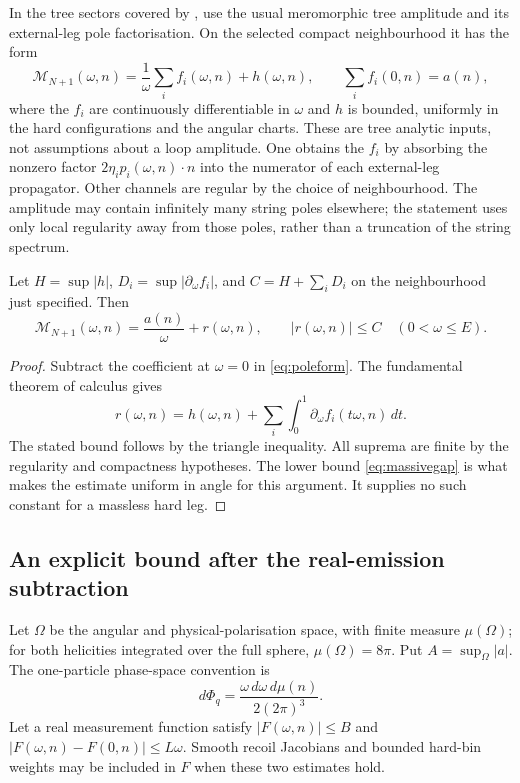 In the tree sectors covered by \cite{Sen17tree}, use the usual meromorphic tree amplitude and its external-leg pole factorisation. On the selected compact neighbourhood it has the form
\begin{equation}\label{eq:poleform}
 \mathcal M_{N+1}(\omega,n)=\frac{1}{\omega}\sum_i f_i(\omega,n)+h(\omega,n),
 \qquad \sum_i f_i(0,n)=a(n),
\end{equation}
where the $f_i$ are continuously differentiable in $\omega$ and $h$ is bounded, uniformly in the hard configurations and the angular charts. These are tree analytic inputs, not assumptions about a loop amplitude. One obtains the $f_i$ by absorbing the nonzero factor $2\eta_i p_i(\omega,n)\cdot n$ into the numerator of each external-leg propagator. Other channels are regular by the choice of neighbourhood. The amplitude may contain infinitely many string poles elsewhere; the statement uses only local regularity away from those poles, rather than a truncation of the string spectrum.

\begin{proposition}\label{prop:treeremainder}
Let $H=\sup|h|$, $D_i=\sup|\partial_\omega f_i|$, and $C=H+\sum_iD_i$ on the neighbourhood just specified. Then
\begin{equation}\label{eq:treeR}
 \mathcal M_{N+1}(\omega,n)=\frac{a(n)}{\omega}+r(\omega,n),
 \qquad |r(\omega,n)|\le C\quad(0<\omega\le E).
\end{equation}
\end{proposition}
\begin{proof}
Subtract the coefficient at $\omega=0$ in \eqref{eq:poleform}. The fundamental theorem of calculus gives
\[
 r(\omega,n)=h(\omega,n)
       +\sum_i\int_0^1\partial_\omega f_i(t\omega,n)\,dt.
\]
The stated bound follows by the triangle inequality. All suprema are finite by the regularity and compactness hypotheses. The lower bound \eqref{eq:massivegap} is what makes the estimate uniform in angle for this argument. It supplies no such constant for a massless hard leg.
\end{proof}

\subsection{An explicit bound after the real-emission subtraction}

Let $\Omega$ be the angular and physical-polarisation space, with finite measure $\mu(\Omega)$; for both helicities integrated over the full sphere, $\mu(\Omega)=8\pi$. Put $A=\sup_\Omega|a|$. The one-particle phase-space convention is
\[
 d\Phi_q=\frac{\omega\,d\omega\,d\mu(n)}{2(2\pi)^3}.
\]
Let a real measurement function satisfy $|F(\omega,n)|\le B$ and $|F(\omega,n)-F(0,n)|\le L\omega$. Smooth recoil Jacobians and bounded hard-bin weights may be included in $F$ when these two estimates hold.

